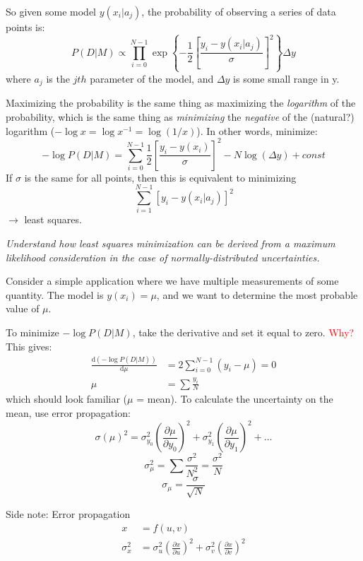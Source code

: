 \documentclass{article}
\newcommand{\test}[1]{%
    \begin{center}
        \colorbox{hl}{\parbox{0.9\textwidth}{\emph{\centering #1}}}
    \end{center}}
\begin{document}
So given some model $y(x_{i}|a_{j})$, the probability of observing a
series of data points is:
\[
    P(D|M) \propto \prod_{i=0}^{N-1}{
        \exp  \left\{ -\frac{1}{2} \left[ \frac{y_{i} - y(x_{i}|a_{j})}{\sigma}
        \right] ^{2} \right\}}
    \Delta{y}
    \]
where $a_{j}$ is the $jth$ parameter of the model, and $\Delta y$ is some small
range in y.

Maximizing the probability is the same thing as
maximizing the \emph{logarithm} of the probability, which is the same thing as
\emph{minimizing} the \emph{negative} of the (natural?) logarithm
($-\log{x} = \log{x^{-1}} = \log(1/x)$).
In other words, minimize:
\[
    -\log P(D|M) = \sum^{N-1}_{i=0}{
        \frac{1}{2} \left[ \frac{y_{i} - y(x_{i})}{\sigma}
        \right]^2
    }
    - N\log \left( \Delta{y} \right) + const
    \]
If $\sigma$ is the same for all points, then this is equivalent to minimizing
\[
    \sum_{i=1}^{N-1}{
        \left[ y_{i} - y \left( x_{i}|a_{j} \right) \right]^{2} }
   \]
$\rightarrow$ least squares.

\test{Understand how least squares minimization can be derived from a maximum
    likelihood consideration in the case of normally-distributed
    uncertainties.}

Consider a simple application where we have multiple measurements of some
quantity. The model is $y(x_{i}) = \mu$, and we want to determine the
most probable value of $\mu$.

To minimize $-\log{P(D|M)}$, take the derivative and set it equal to zero.
\textcolor{red}{Why?}
This gives:
\begin{align*}
    \frac{\mathrm{d}(-\log P(D|M))}{\mathrm{d}\mu}
    &= 2\sum^{N-1}_{i=0}(y_{i}-\mu) = 0 \\[1ex]
    \mu &= \sum \frac{y_{i}}{N}
\end{align*}
which should look familiar ($\mu$ = mean).
To calculate the uncertainty on the mean, use error propagation:
\[
    \sigma(\mu)^2 = \sigma_{y_{0}}^2
    \left( \frac{\partial{\mu}}{\partial{y}_{0}}\right)^2
    + \sigma_{y_{1}}^2
    \left( \frac{\partial{\mu}}{\partial{y}_{1}}\right)^2
    + \ldots
    \]
\[
    \sigma_{\mu}^{2}
    = \sum{ \frac{\sigma^{2}}{N^{2}}
    = \frac{\sigma^{2}}{N}}
    \]
\[
    \sigma_{\mu} = \frac{\sigma}{\sqrt{N}}
    \]

\begin{framed}
Side note: Error propagation
\begin{align*}
    x &= f(u,v)\\
    \sigma_{x}^{2} &=
    \sigma_{u}^{2}\left(\frac{\partial{x}}{\partial{u}}\right)^{2} +
    \sigma_{v}^{2}\left(\frac{\partial{x}}{\partial{v}}\right)^{2}
\end{align*}
\end{framed}
\end{document}
